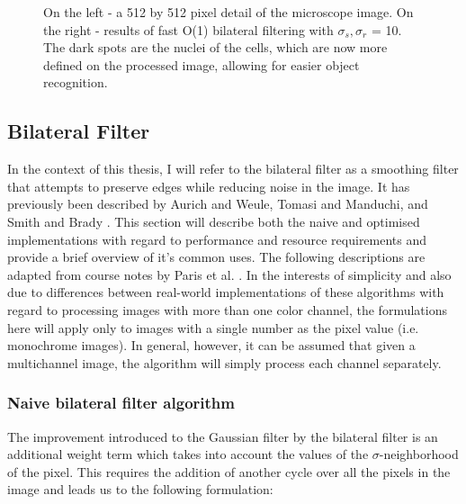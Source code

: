 \documentclass [12pt,a4paper]{report}
\begin{document}
\begin{center}
\begin{figure}[h]
\begin{subfigure}{.5\textwidth}
\end{subfigure}
\caption{On the left - a 512 by 512 pixel detail of the microscope image. On the right - results of fast O(1) bilateral filtering with $\sigma_s, \sigma_r$ = 10. The dark spots are the nuclei of the cells, which are now more defined on the processed image, allowing for easier object recognition.}
\label{fig_gaussian_blur}
\end{figure}
\end{center}

\subsection{Bilateral Filter}

In the context of this thesis, I will refer to the bilateral filter as a smoothing filter that attempts to preserve edges while reducing noise in the image. It has previously been described by Aurich and Weule, Tomasi and Manduchi, and Smith and Brady \cite{aurich1995non,smith1997susan,tomasi1998bilateral}. This section will describe both the naive and optimised implementations with regard to performance and resource requirements and provide a brief overview of it's common uses. The following descriptions are adapted from course notes by Paris et al. \cite{bf_course}. In the interests of simplicity and also due to differences between real-world implementations of these algorithms with regard to processing images with more than one color channel, the formulations here will apply only to images with a single number as the pixel value (i.e. monochrome images). In general, however, it can be assumed that given a multichannel image, the algorithm will simply process each channel separately.

\subsubsection{Naive bilateral filter algorithm}

The improvement introduced to the Gaussian filter by the bilateral filter is an additional weight term which takes into account the values of the $\sigma$-neighborhood of the pixel. This requires the addition of another cycle over all the pixels in the image and leads us to the following formulation:
\end{document}
